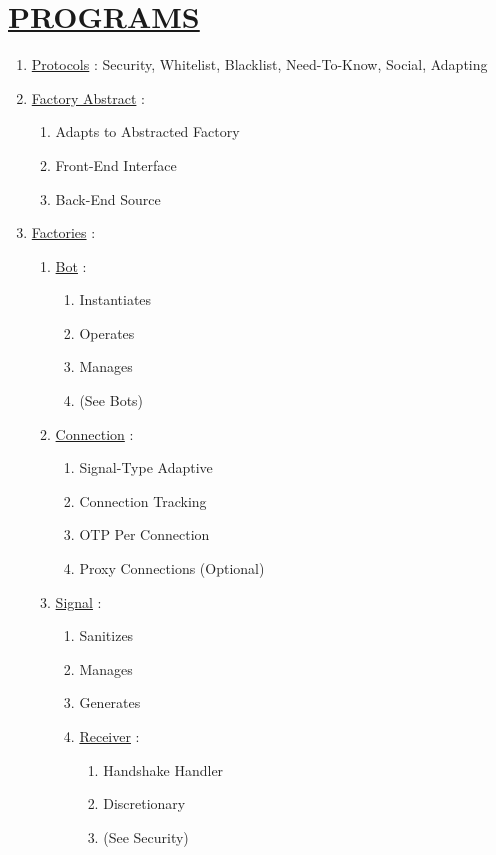 \documentclass[11pt]{article}
\begin{document}
\section*{\ul{PROGRAMS}}
\begin{enumerate}
	\item[] \ul{Protocols} : Security, Whitelist, Blacklist, Need-To-Know, Social, Adapting
	
	\item[] \ul{Factory Abstract} :
	\begin{enumerate}
		\item[] Adapts to Abstracted Factory
		\item[] Front-End Interface
		\item[] Back-End Source
	\end{enumerate}
	
	\item[] \ul{Factories} :
	\begin{enumerate}
		\item[] \ul{Bot} :
		\begin{enumerate}
			\item[] Instantiates
			\item[] Operates
			\item[] Manages
			\item[] (See Bots)
		\end{enumerate}
		
		\item[] \ul{Connection} :
		\begin{enumerate}
			\item[] Signal-Type Adaptive
			\item[] Connection Tracking
			\item[] OTP Per Connection
			\item[] Proxy Connections (Optional)
		\end{enumerate}
		
		\item[] \ul{Signal} :
		\begin{enumerate}
			\item[] Sanitizes
			\item[] Manages
			\item[] Generates
			
			\item[] \ul{Receiver}  :
			\begin{enumerate}
				\item[] Handshake Handler
				\item[] Discretionary
				\item[] (See Security)
			\end{enumerate}
			

\end{enumerate}
\end{enumerate}
\end{enumerate}
\end{document}
